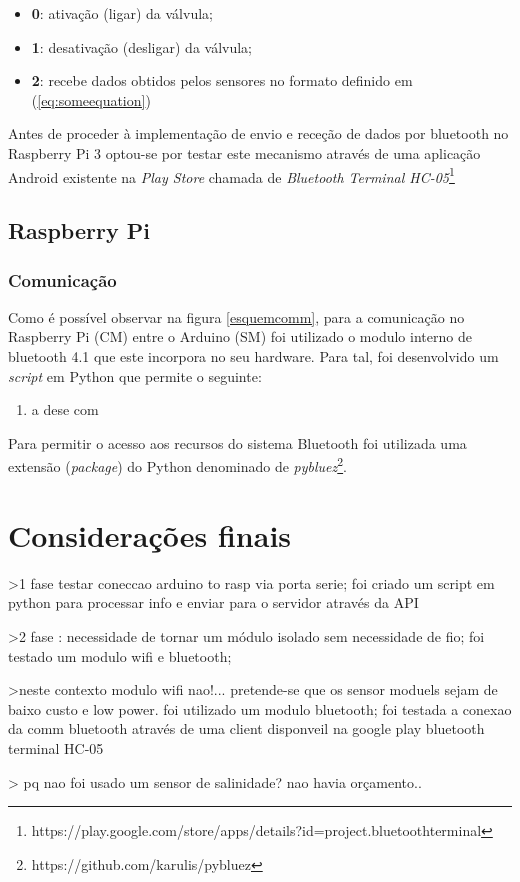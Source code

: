 \begin{itemize}
	\item \textbf{0}: ativação (ligar) da válvula; 
	\item \textbf{1}: desativação (desligar) da válvula; 
	\item \textbf{2}: recebe dados obtidos pelos sensores no formato definido em (\ref{eq:someequation})
\end{itemize}

Antes de proceder à implementação de envio e receção de dados por bluetooth no Raspberry Pi 3 optou-se por testar este mecanismo através de uma aplicação Android existente na \textit{Play Store} chamada de \textit{Bluetooth Terminal HC-05}\footnote{https://play.google.com/store/apps/details?id=project.bluetoothterminal}

\subsection{Raspberry Pi}


\subsubsection{Comunicação}


Como é possível observar na figura \ref{esquemcomm}, para a comunicação no Raspberry Pi (\ac{CM}) entre o Arduino (\ac{SM}) foi utilizado o modulo interno de bluetooth 4.1 que este incorpora no seu hardware. Para tal, foi desenvolvido um \textit{script} em Python que permite o seguinte: 


\begin{enumerate}
	\item a dese com 
\end{enumerate}

Para permitir o acesso aos recursos do sistema Bluetooth foi utilizada uma extensão (\textit{package}) do Python denominado de \textit{pybluez}\footnote{https://github.com/karulis/pybluez}. 
 

 

\section{Considerações finais}


>1 fase testar coneccao arduino to rasp via porta serie; foi criado um script em python para processar info e enviar para o servidor através da API 

>2 fase : necessidade de tornar um módulo isolado sem necessidade de fio; foi testado um modulo wifi e bluetooth; 

>neste contexto modulo wifi nao!... pretende-se que os sensor moduels sejam de baixo custo e low power. foi utilizado um modulo bluetooth; foi testada a conexao da comm bluetooth através de uma client disponveil na google play bluetooth terminal HC-05 


> 
pq nao foi usado um sensor de salinidade? nao havia orçamento.. 



 


